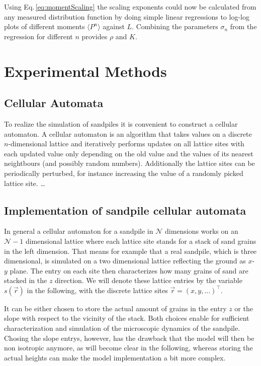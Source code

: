 Using Eq.\,\eqref{eq:momentScaling} the scaling exponents could now be calculated from any measured distribution
function by doing simple linear regressions to log-log plots of different moments $\langle P^n\rangle$ against $L$.
Combining the parameters $\sigma_n$ from the regression for different $n$ provides $\rho$ and $K$.

\section{Experimental Methods}
\label{sec:experiment}

\subsection{Cellular Automata}
\label{sec:cellularAutomata}
To realize the simulation of sandpiles it is convenient to construct a cellular automaton.
A cellular automaton is an algorithm that takes values on a discrete $n$-dimensional lattice and iteratively
performs updates on all lattice sites with each updated value only depending on the old value and the values of its
nearest neightbours (and possibly random numbers). Additionally the lattice sites can be periodically perturbed,
for instance increasing the value of a randomly picked lattice site.
\dots%

\subsection{Implementation of sandpile cellular automata}
\label{sec:sandpileImplementation}
In general a cellular automaton for a sandpile in $\mathcal{N}$ dimensions works on an $\mathcal{N}-1$ dimensional
lattice where each lattice site stands for a stack of sand grains in the left dimension. That means for example that
a real sandpile, which is three dimensional, is simulated on a two dimensional lattice reflecting the ground as $x$-$y$
plane. The entry on each site then characterizes how many grains of sand are stacked in the $z$ direction.
We will denote these lattice entries by the variable $s(\vec{r})$ in the following, with the discrete lattice sites
$\vec{r}=(x,y,\ldots)^\top$.

It can be either chosen to store the actual amount of grains in the entry $z$ or the slope with respect to the vicinity
of the stack. Both choices enable for sufficient characterization and simulation of the microscopic dynamics of the
sandpile. Chosing the slope entrys, however, has the drawback that the model will then be non isotropic anymore, as will
become clear in the following, whereas storing the actual heights can make the model implementation a bit more complex.

